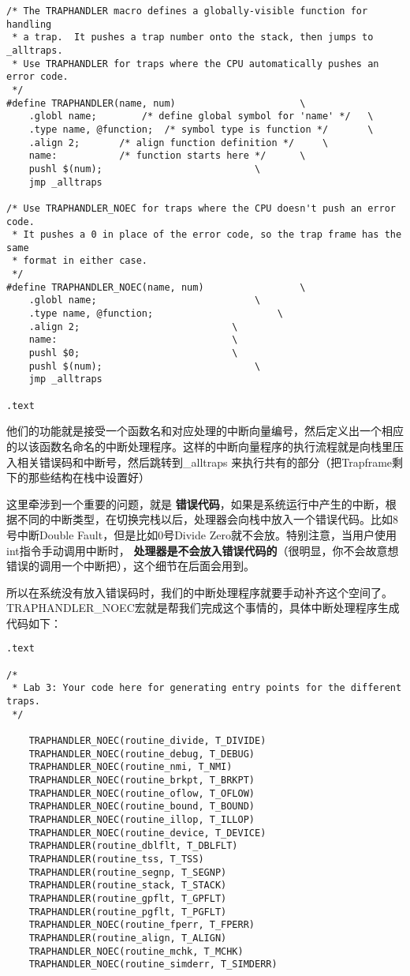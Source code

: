 \documentclass{article}
\newcommand{\highlight}[1]{{\bfseries \color{red}  #1}}
\newcommand{\funcname}[1]{{\ttfamily \small #1}}
\begin{document}
\begin{CJK*}{UTF8}{gkai}
\begin{lstlisting}[style=acode, title={\scriptsize \ttfamily \bfseries kern/trapentry.S}]
/* The TRAPHANDLER macro defines a globally-visible function for handling
 * a trap.  It pushes a trap number onto the stack, then jumps to _alltraps.
 * Use TRAPHANDLER for traps where the CPU automatically pushes an error code.
 */ 
#define TRAPHANDLER(name, num)						\
	.globl name;		/* define global symbol for 'name' */	\
	.type name, @function;	/* symbol type is function */		\
	.align 2;		/* align function definition */		\
	name:			/* function starts here */		\
	pushl $(num);							\
	jmp _alltraps

/* Use TRAPHANDLER_NOEC for traps where the CPU doesn't push an error code.
 * It pushes a 0 in place of the error code, so the trap frame has the same
 * format in either case.
 */
#define TRAPHANDLER_NOEC(name, num)					\
	.globl name;							\
	.type name, @function;						\
	.align 2;							\
	name:								\
	pushl $0;							\
	pushl $(num);							\
	jmp _alltraps

.text
\end{lstlisting}

他们的功能就是接受一个函数名和对应处理的中断向量编号，然后定义出一个相应的以该函数名命名的中断处理程序。这样的中断向量程序的执行流程就是向栈里压入相关错误码和中断号，然后跳转到\funcname{\_alltraps} 来执行共有的部分（把Trapframe剩下的那些结构在栈中设置好）

这里牵涉到一个重要的问题，就是\highlight{错误代码}，如果是系统运行中产生的中断，根据不同的中断类型，在切换完栈以后，处理器会向栈中放入一个错误代码。比如8号中断Double Fault，但是比如0号Divide Zero就不会放。特别注意，当用户使用int指令手动调用中断时，\highlight{处理器是不会放入错误代码的}（很明显，你不会故意想错误的调用一个中断把），这个细节在后面会用到。

所以在系统没有放入错误码时，我们的中断处理程序就要手动补齐这个空间了。\funcname{TRAPHANDLER\_NOEC}宏就是帮我们完成这个事情的，具体中断处理程序生成代码如下：


\begin{lstlisting}[style=acode, title={\scriptsize \ttfamily \bfseries kern/trapentry.S}]
.text

/*
 * Lab 3: Your code here for generating entry points for the different traps.
 */

    TRAPHANDLER_NOEC(routine_divide, T_DIVIDE)
    TRAPHANDLER_NOEC(routine_debug, T_DEBUG)
    TRAPHANDLER_NOEC(routine_nmi, T_NMI)
    TRAPHANDLER_NOEC(routine_brkpt, T_BRKPT)
    TRAPHANDLER_NOEC(routine_oflow, T_OFLOW)
    TRAPHANDLER_NOEC(routine_bound, T_BOUND)
    TRAPHANDLER_NOEC(routine_illop, T_ILLOP)
    TRAPHANDLER_NOEC(routine_device, T_DEVICE)
    TRAPHANDLER(routine_dblflt, T_DBLFLT)
    TRAPHANDLER(routine_tss, T_TSS)
    TRAPHANDLER(routine_segnp, T_SEGNP)
    TRAPHANDLER(routine_stack, T_STACK)
    TRAPHANDLER(routine_gpflt, T_GPFLT)
    TRAPHANDLER(routine_pgflt, T_PGFLT)
    TRAPHANDLER_NOEC(routine_fperr, T_FPERR)
    TRAPHANDLER(routine_align, T_ALIGN)
    TRAPHANDLER_NOEC(routine_mchk, T_MCHK)
    TRAPHANDLER_NOEC(routine_simderr, T_SIMDERR)



\end{lstlisting}
\end{CJK*}
\end{document}
